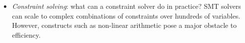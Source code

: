 {\begin{itemize}[itemsep=2mm]
Language constructs such as loops might exponentially increase the number of execution states. It is thus unlikely that a symbolic execution engine can exhaustively explore all the possible states within a reasonable amount of time. %
  \item {\em Constraint solving}: what can a constraint solver do in practice?
SMT solvers can scale to complex combinations of constraints over hundreds of variables. However, constructs such as non-linear arithmetic pose a major obstacle to efficiency.

\end{itemize}}
